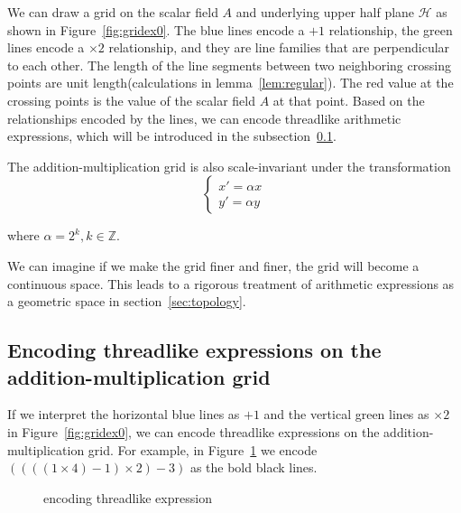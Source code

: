 We can draw a grid on the scalar field $A$ and underlying upper half plane $\mathcal{H}$ as shown in Figure~\ref{fig:gridex0}.
The blue lines encode a $+ 1$ relationship, the green lines encode a $\times 2$ relationship,
and they are line families that are perpendicular to each other.
The length of the line segments between two neighboring crossing points are unit length(calculations in lemma~\ref{lem:regular}).
The red value at the crossing points is the value of the scalar field $A$ at that point.
Based on the relationships encoded by the lines, we can encode threadlike arithmetic expressions,
which will be introduced in the subsection~\ref{subsec:encoding}.

The addition-multiplication grid is also scale-invariant under the transformation
\[
\begin{cases}
x' = \alpha x\\
y' = \alpha y
\end{cases}
\]

where $\alpha = 2^k , k \in \mathbb{Z}$.

We can imagine if we make the grid finer and finer, the grid will become a continuous space.
This leads to a rigorous treatment of arithmetic expressions as a geometric space in section~\ref{sec:topology}.

\subsection{Encoding threadlike expressions on the addition-multiplication grid}\label{subsec:encoding}

If we interpret the horizontal blue lines as $+ 1$ and the vertical green lines as $\times 2$ in Figure~\ref{fig:gridex0},
we can encode threadlike expressions on the addition-multiplication grid.
For example, in Figure~\ref{fig:encoding}
we encode $((((1 \times 4) - 1) \times 2) - 3)$ as the bold black lines.

\begin{figure}[ht]
\centering
{}
\caption{encoding threadlike expression}\label{fig:encoding}
\end{figure}

